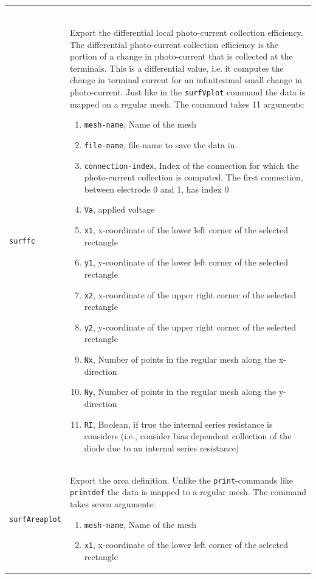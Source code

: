 \documentclass[noshowpacs,preprintnumbers,amsmath,amssymb, letter]{revtex4}
\begin{document}
\begin{longtable}{p{}p{}}
\begin{enumerate}
\end{enumerate}\\
\texttt{surffc}		& Export the differential local photo-current collection efficiency. The differential photo-current collection efficiency is the portion of a change in photo-current that is collected at the terminals. This is a differential value, i.e. it computes the change in terminal current for an infinitesimal small change in photo-current. Just like in the \texttt{surfVplot} command the data is mapped on a regular mesh. The command takes 11 arguments:
\begin{enumerate}
\item \texttt{mesh-name}, Name of the mesh
\item \texttt{file-name}, file-name to save the data in.
\item \texttt{connection-index}, Index of the connection for which the photo-current collection is computed. The first connection, between electrode 0 and 1,  has index 0
\item \texttt{Va}, applied voltage
\item \texttt{x1}, x-coordinate of the lower left corner of the selected rectangle
\item \texttt{y1}, y-coordinate of the lower left corner of the selected rectangle
\item \texttt{x2}, x-coordinate of the upper right corner of the selected rectangle
\item \texttt{y2}, y-coordinate of the upper right corner of the selected rectangle
\item \texttt{Nx}, Number of points in the regular mesh along the x-direction
\item \texttt{Ny}, Number of points in the regular mesh along the y-direction
\item \texttt{RI}, Boolean, if true the internal series resistance is considers (i.e., consider bias dependent collection of the diode due to an internal series resistance)
\end{enumerate}\\
\texttt{surfAreaplot}		& Export the area definition. Unlike the \texttt{print}-commands like \texttt{printdef} the data is mapped to a regular mesh. The command takes seven arguments:
\begin{enumerate}
\item \texttt{mesh-name}, Name of the mesh
\item \texttt{x1}, x-coordinate of the lower left corner of the selected rectangle

\end{enumerate}
\end{longtable}
\end{document}

